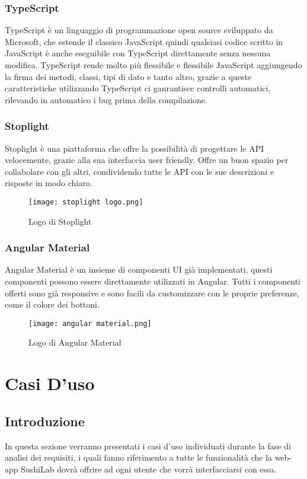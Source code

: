\subsubsection{TypeScript}
TypeScript è un linguaggio di programmazione open source sviluppato da Microsoft, che estende il classico JavaScript quindi qualsiasi codice scritto in JavaScript è anche eseguibile con TypeScript direttamente senza nessuna modifica. TypeScript rende molto più flessibile e flessibile JavaScript aggiungendo la firma dei metodi, classi, tipi di dato e tanto altro, grazie a queste caratteristiche utilizzando TypeScript ci ganrantisce controlli automatici, rilevando in automatico i bug prima della compilazione.
\subsubsection{Stoplight}
Stoplight è una piattaforma che offre la possibilità di progettare le API velocemente, grazie alla sua interfaccia user friendly. Offre un buon spazio per collabolare con gli altri, condividendo tutte le API con le sue descrizioni e risposte in modo chiaro.
\begin{figure}[H]
    \centering
    \texttt{[image: stoplight logo.png]}
    \caption{Logo di Stoplight}
\end{figure}
\subsubsection{Angular Material}
Angular Material è un insieme di componenti UI già implementati, questi componenti possono essere direttamente utilizzati in Angular. Tutti i componenti offerti sono già responsive e sono facili da customizzare con le proprie preferenze, come il colore dei bottoni.
\begin{figure}[H]
    \centering
    \texttt{[image: angular material.png]}
    \caption{Logo di Angular Material}
\end{figure}
\section{Casi D'uso}
\subsection{Introduzione }
In questa sezione verranno presentati i casi d'uso individuati durante la fase di analisi dei requisiti, i quali fanno riferimento a tutte le funzionalità che la web-app SushiLab dovrà offrire ad ogni utente che vorrà interfacciarsi con essa.
